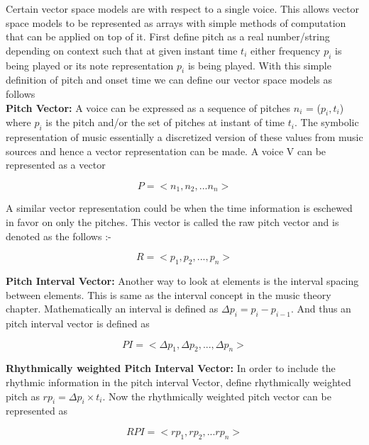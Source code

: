 \noindent Certain vector space models are with respect to a single voice. This allows vector space models to be represented as arrays with simple methods of computation that can be applied on top of it. First define pitch as a real number/string depending on context such that at given instant time $t_i$ either frequency $p_i$ is being played or its note representation $p_i$ is being played. With this simple definition of pitch and onset time we can define our vector space models as follows\\
 
\noindent \textbf{Pitch Vector:} A voice can be expressed as a sequence of pitches $n_i$ = ($p_i, t_i$) where $p_i$ is the pitch and/or the set of pitches at instant of time $t_i$. The symbolic representation of music essentially a discretized version of these values from music sources and hence a vector representation can be made. A voice V can be represented as a vector

\begin{equation}
P = <n_1, n_2, ... n_n>
\end{equation}

\noindent A similar vector representation could be when the time information is eschewed in favor on only the pitches. This vector is called the raw pitch vector and is denoted as the follows :-

\begin{equation} \label{eq:rawpitch}
R = <p_1, p_2, ..., p_n>
\end{equation}

\noindent \textbf{Pitch Interval Vector:} Another way to look at elements is the interval spacing between elements. This is same as the interval concept in the music theory chapter. Mathematically an interval is defined as $\Delta p_i = p_i - p_{i-1}$. And thus an pitch interval vector is defined as

\begin{equation}
PI = <\Delta p_1, \Delta p_2, ... , \Delta p_n>
\end{equation}

\noindent \textbf{Rhythmically weighted Pitch Interval Vector:} In order to include the rhythmic information in the pitch interval Vector, define rhythmically weighted pitch as $rp_i = \Delta p_i \times t_i$. Now the rhythmically weighted pitch vector can be represented as

\begin{equation}
RPI = <rp_1, rp_2, ... rp_n>
\end{equation}

